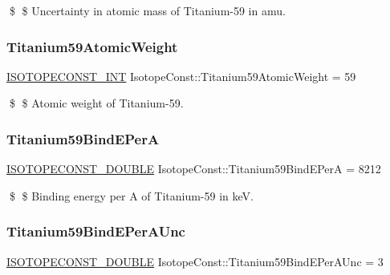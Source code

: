 \$ \$ Uncertainty in atomic mass of Titanium-\/59 in amu. \mbox{\label{group___isotope_const-_titanium-_ti59_ga535e90eb52dc4344c9497e0dd226df7b}} 
\subsubsection{\texorpdfstring{Titanium59\+Atomic\+Weight}{Titanium59AtomicWeight}}
{\footnotesize\ttfamily \mbox{\hyperlink{group___isotope_const-_macros_ga5f18360b3e99483a35c32d789e62621c}{I\+S\+O\+T\+O\+P\+E\+C\+O\+N\+S\+T\+\_\+\+I\+NT}} Isotope\+Const\+::\+Titanium59\+Atomic\+Weight = 59}

\$ \$ Atomic weight of Titanium-\/59. \mbox{\label{group___isotope_const-_titanium-_ti59_gaff0e11d942a0a5db3641d631bf04eda0}} 
\subsubsection{\texorpdfstring{Titanium59\+Bind\+E\+PerA}{Titanium59BindEPerA}}
{\footnotesize\ttfamily \mbox{\hyperlink{group___isotope_const-_macros_ga8f45a7272ce02c0b4c65c44636ed719a}{I\+S\+O\+T\+O\+P\+E\+C\+O\+N\+S\+T\+\_\+\+D\+O\+U\+B\+LE}} Isotope\+Const\+::\+Titanium59\+Bind\+E\+PerA = 8212}

\$ \$ Binding energy per A of Titanium-\/59 in keV. \mbox{\label{group___isotope_const-_titanium-_ti59_ga4db66fca81ea485730fe784165c7230b}} 
\subsubsection{\texorpdfstring{Titanium59\+Bind\+E\+Per\+A\+Unc}{Titanium59BindEPerAUnc}}
{\footnotesize\ttfamily \mbox{\hyperlink{group___isotope_const-_macros_ga8f45a7272ce02c0b4c65c44636ed719a}{I\+S\+O\+T\+O\+P\+E\+C\+O\+N\+S\+T\+\_\+\+D\+O\+U\+B\+LE}} Isotope\+Const\+::\+Titanium59\+Bind\+E\+Per\+A\+Unc = 3}

